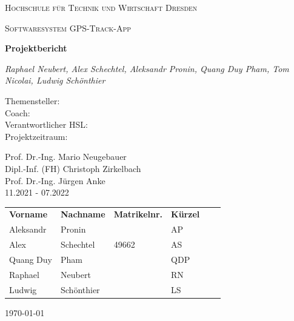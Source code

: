\documentclass[10pt]{article}
\begin{document}
\begin{titlepage}
    \centering
    {\scshape\LARGE Hochschule für Technik und Wirtschaft Dresden \par}
    \vspace{1cm}
    {\scshape\Large Softwaresystem \glqq GPS-Track-App\grqq\par}
    \vspace{1.5cm}
    {\huge\bfseries Projektbericht\par}
    \vspace{2cm}
    {\Large\itshape Raphael Neubert, Alex Schechtel, Aleksandr Pronin, Quang Duy Pham, Tom Nicolai, Ludwig Schönthier\par}
    \vfill
    \vfill
    \begin{minipage}{0.3\textwidth}
        Themensteller:\\
        Coach:\\
        Verantwortlicher HSL:\\
        Projektzeitraum:
    \end{minipage}
    \begin{minipage}{0.4\textwidth}
        Prof. Dr.-Ing. Mario Neugebauer\\
        Dipl.-Inf. (FH) Christoph Zirkelbach\\
        Prof. Dr.-Ing. Jürgen Anke\\
        11.2021 - 07.2022
    \end{minipage}
    \vfill
\begin{table}[H]
    \begin{tabular}{llllll}
    \textbf{Vorname} & \textbf{Nachname} & \textbf{Matrikelnr.} & \textbf{Kürzel} &  &  \\
    Aleksandr        & Pronin            &                      & AP              &  &  \\
    Alex             & Schechtel         & 49662                & AS              &  &  \\
    Quang Duy        & Pham              &                      & QDP             &  &  \\
    Raphael          & Neubert           &                      & RN              &  &  \\
    Ludwig           & Schönthier        &                      & LS              &  &
    \end{tabular}
    \centering
\end{table}
\vfill

    {\large \today\par}
\end{titlepage}
\tableofcontents
\newpage
{}
\end{document}
